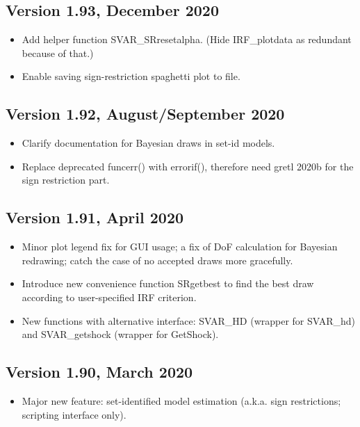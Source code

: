 \documentclass[a4paper,10pt]{article}
\newcounter{script}[section]
\begin{document}
\subsection*{Version 1.93, December 2020}
\begin{itemize}
\item Add helper function SVAR\_SRresetalpha. (Hide IRF\_plotdata as 
 redundant because of that.)
 \item Enable saving sign-restriction spaghetti plot to file.
\end{itemize}

\subsection*{Version 1.92, August/September 2020}
\begin{itemize}
\item Clarify documentation for Bayesian draws in set-id models.
\item Replace deprecated funcerr() with errorif(), therefore need gretl 2020b
  for the sign restriction part. 
\end{itemize}

\subsection*{Version 1.91, April 2020}
\begin{itemize}
\item Minor plot legend fix for GUI usage; a fix of DoF calculation for
Bayesian redrawing; catch the case of no accepted draws more gracefully.
\item Introduce new convenience function SRgetbest to find the best draw
according to user-specified IRF criterion.
\item New functions with alternative interface: SVAR\_HD (wrapper for SVAR\_hd)
and SVAR\_getshock (wrapper for GetShock).
\end{itemize}

\subsection*{Version 1.90, March 2020}
\begin{itemize}
\item Major new feature: set-identified model estimation (a.k.a. sign restrictions;
scripting interface only). 
 
\end{itemize}
\end{document}
